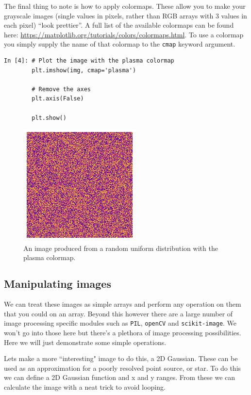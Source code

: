 The final thing to note is how to apply colormaps. These allow you to make your grayscale images (single values in pixels, rather than RGB arrays with 3 values in each pixel) ``look prettier''. A full list of the available colormaps can be found here: \url{https://matplotlib.org/tutorials/colors/colormaps.html}. To use a colormap you simply supply the name of that colormap to the \texttt{cmap} keyword argument.

\begin{lstlisting}[style=PY]
In [4]: # Plot the image with the plasma colormap
        plt.imshow(img, cmap='plasma')

        # Remove the axes
        plt.axis(False)
        
        plt.show()
\end{lstlisting}

\begin{figure}[H]
	\centering
	\includegraphics[scale=0.7]{Pictures/randomimgexampleplasma.png}
\caption{An image produced from a random uniform distribution with the plasma colormap.}
\label{fig:randimgnoax}
\end{figure}

\subsection{Manipulating images}
\label{sec:maniimg}

We can treat these images as simple arrays and perform any operation on them that you could on an array. Beyond this however there are a large number of image processing specific modules such as \texttt{PIL}, \texttt{openCV} and \texttt{scikit-image}. We won't go into those here but there's a plethora of image processing possibilities. Here we will just demonstrate some simple operations.

Lets make a more ``interesting" image to do this, a 2D Gaussian. These can be used as an approximation for a poorly resolved point source, or star. To do this we can define a 2D Gaussian function and x and y ranges. From these we can calculate the image with a neat trick to avoid looping.

